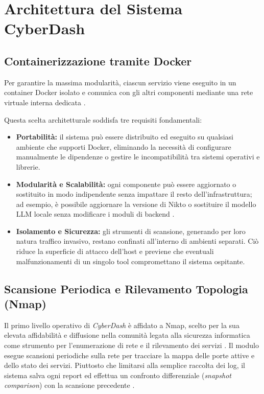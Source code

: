 \documentclass{article}
\begin{document}
\section{Architettura del Sistema CyberDash}

\subsection{Containerizzazione tramite Docker}
Per garantire la massima modularità, ciascun servizio viene eseguito in un container Docker isolato e comunica con gli altri componenti mediante una rete virtuale interna dedicata \cite{alkhunaizi_toward_2025, chisom_cyberhygienescan_2025}.

Questa scelta architetturale soddisfa tre requisiti fondamentali:
\begin{itemize}
    \item \textbf{Portabilità:} il sistema può essere distribuito ed eseguito su qualsiasi ambiente che supporti Docker, eliminando la necessità di configurare manualmente le dipendenze o gestire le incompatibilità tra sistemi operativi e librerie.
    \item \textbf{Modularità e Scalabilità:} ogni componente può essere aggiornato o sostituito in modo indipendente senza impattare il resto dell'infrastruttura; ad esempio, è possibile aggiornare la versione di Nikto o sostituire il modello LLM locale senza modificare i moduli di backend \cite{addis_llm-based_2026}.
    \item \textbf{Isolamento e Sicurezza:} gli strumenti di scansione, generando per loro natura traffico invasivo, restano confinati all'interno di ambienti separati. Ciò riduce la superficie di attacco dell'host e previene che eventuali malfunzionamenti di un singolo tool compromettano il sistema ospitante.
\end{itemize}



\subsection{Scansione Periodica e Rilevamento Topologia (Nmap)}
Il primo livello operativo di \textit{CyberDash} è affidato a Nmap, scelto per la sua elevata affidabilità e diffusione nella comunità legata alla sicurezza informatica come strumento per l'enumerazione di rete e il rilevamento dei servizi \cite{kashyap_learning_2021, singh_eagle_2021}.
Il modulo esegue scansioni periodiche sulla rete per tracciare la mappa delle porte attive e dello stato dei servizi. Piuttosto che limitarsi alla semplice raccolta dei log, il sistema salva ogni report ed effettua un confronto differenziale (\textit{snapshot comparison}) con la scansione precedente \cite{corcoran_post-scan_2000, persson_explaining_2018}. 
\end{document}
